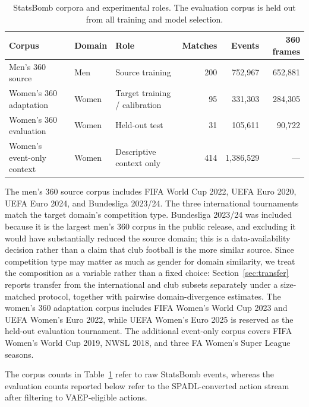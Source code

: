 \documentclass[runningheads]{llncs}
\begin{document}
\begin{table}[!htbp]
\centering
\scriptsize
\caption{StatsBomb corpora and experimental roles. The evaluation corpus is held out from all training and model selection.}
\label{tab:corpora}
\begin{tabular}{@{}ll l r r r@{}}
\toprule
\textbf{Corpus} & \textbf{Domain} & \textbf{Role} &
\textbf{Matches} & \textbf{Events} & \textbf{360 frames} \\
\midrule
Men's 360 source
& Men
& Source training
& 200
& 752{,}967
& 652{,}881 \\

Women's 360 adaptation
& Women
& Target training / calibration
& 95
& 331{,}303
& 284{,}305 \\

Women's 360 evaluation
& Women
& Held-out test
& 31
& 105{,}611
& 90{,}722 \\

Women's event-only context
& Women
& Descriptive context only
& 414
& 1{,}386{,}529
& --- \\
\bottomrule
\end{tabular}
\end{table}

The men's 360 source corpus includes FIFA World Cup 2022, UEFA Euro 2020, UEFA Euro 2024, and Bundesliga 2023/24. The three international tournaments match the target domain's competition type. Bundesliga 2023/24 was included because it is the largest men's 360 corpus in the public release, and excluding it would have substantially reduced the source domain; this is a data-availability decision rather than a claim that club football is the more similar source. Since competition type may matter as much as gender for domain similarity, we treat the composition as a variable rather than a fixed choice: Section~\ref{sec:transfer} reports transfer from the international and club subsets separately under a size-matched protocol, together with pairwise domain-divergence estimates. The women's 360 adaptation corpus includes FIFA Women's World Cup 2023 and UEFA Women's Euro 2022, while UEFA Women's Euro 2025 is reserved as the held-out evaluation tournament. The additional event-only corpus covers FIFA Women's World Cup 2019, NWSL 2018, and three FA Women's Super League seasons.

The corpus counts in Table~\ref{tab:corpora} refer to raw StatsBomb events, whereas the evaluation counts reported below refer to the SPADL-converted action stream after filtering to VAEP-eligible actions.
\end{document}
